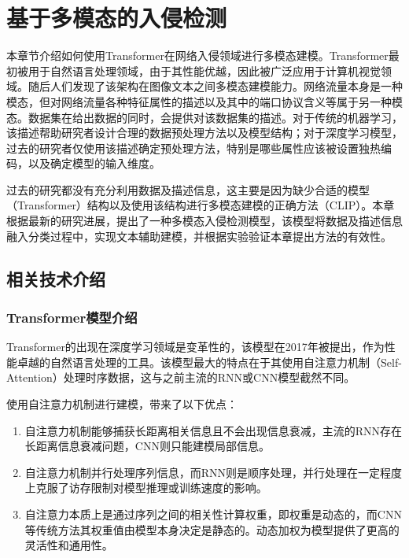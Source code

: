 

\chapter{基于多模态的入侵检测}
\label{cha:command}
本章节介绍如何使用Transformer在网络入侵领域进行多模态建模。Transformer最初被用于自然语言处理领域，由于其性能优越，因此被广泛应用于计算机视觉领域。随后人们发现了该架构在图像文本之间多模态建模能力。网络流量本身是一种模态，但对网络流量各种特征属性的描述以及其中的端口协议含义等属于另一种模态。数据集在给出数据的同时，会提供对该数据集的描述。对于传统的机器学习，该描述帮助研究者设计合理的数据预处理方法以及模型结构；对于深度学习模型，过去的研究者仅使用该描述确定预处理方法，特别是哪些属性应该被设置独热编码，以及确定模型的输入维度。

过去的研究都没有充分利用数据及描述信息，这主要是因为缺少合适的模型（Transformer）结构以及使用该结构进行多模态建模的正确方法（CLIP\cite{pmlr-v139-radford21a}）。本章根据最新的研究进展，提出了一种多模态入侵检测模型，该模型将数据及描述信息融入分类过程中，实现文本辅助建模，并根据实验验证本章提出方法的有效性。

\section{相关技术介绍}
\subsection{Transformer模型介绍}
Transformer的出现在深度学习领域是变革性的，该模型在2017年被提出，作为性能卓越的自然语言处理的工具。该模型最大的特点在于其使用自注意力机制（Self-Attention）处理时序数据，这与之前主流的RNN或CNN模型截然不同。

使用自注意力机制进行建模，带来了以下优点：

\begin{enumerate}
    \item 自注意力机制能够捕获长距离相关信息且不会出现信息衰减，主流的RNN存在长距离信息衰减问题，CNN则只能建模局部信息。
    \item 自注意力机制并行处理序列信息，而RNN则是顺序处理，并行处理在一定程度上克服了访存限制对模型推理或训练速度的影响。
    \item 自注意力本质上是通过序列之间的相关性计算权重，即权重是动态的，而CNN等传统方法其权重值由模型本身决定是静态的。动态加权为模型提供了更高的灵活性和通用性。
\end{enumerate}

